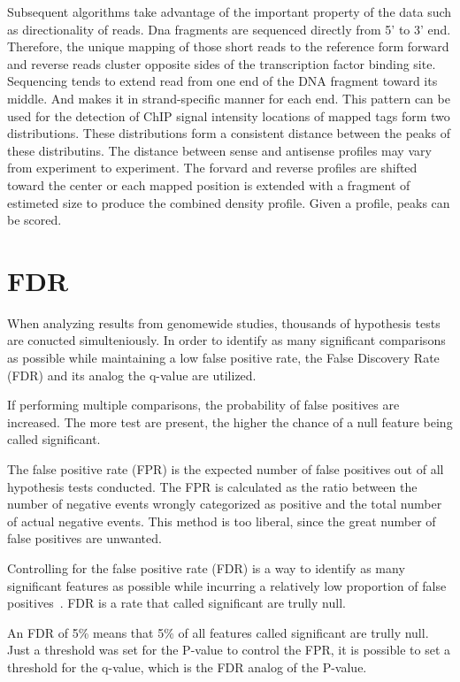 Subsequent algorithms take advantage of the important property of the data such as directionality of reads.
Dna fragments are sequenced directly from 5' to 3' end.
Therefore, the unique mapping of those short reads to the reference form forward and reverse reads cluster opposite sides of the transcription factor binding site.
Sequencing tends to extend read from one end of the DNA fragment toward its middle.
And makes it in strand-specific manner for each end. 
This pattern can be used for the detection of ChIP signal intensity locations of mapped tags form two distributions.
These distributions form a consistent distance between the peaks of these distributins.
The distance between sense and antisense profiles may vary from experiment to experiment.
The forvard and reverse profiles are shifted toward the center or each mapped position is extended with a fragment of estimeted size to produce the combined density profile.
Given a profile, peaks can be scored.

\section{FDR}

When analyzing results from genomewide studies, thousands of hypothesis tests are conucted simulteniously.
In order to identify as many significant comparisons as possible while maintaining a low false positive rate, the False Discovery Rate (FDR) and its analog the q-value are utilized.

If performing multiple comparisons, the probability of false positives are increased.
The more test are present, the higher the chance of a null feature being called significant.

The false positive rate (FPR) is the expected number of false positives out of all hypothesis tests conducted.
The FPR is calculated as the ratio between the number of negative events wrongly categorized as positive and the total number of actual negative events.
This method is too liberal, since the great number of false positives are unwanted.

Controlling for the false positive rate (FDR) is a way to identify as many significant features as possible while incurring a relatively low proportion of false positives~\cite{benjamini1995controlling}.
FDR is a rate that called significant are trully null.

An FDR of 5\% means that 5\% of all features called significant are trully null.
Just a threshold was set for the P-value to control the FPR, it is possible to set a threshold for the q-value, which is the FDR analog of the P-value.

